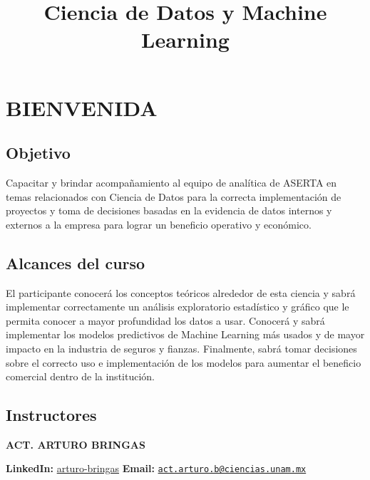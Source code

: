 \documentclass[
]{book}
\title{Ciencia de Datos y Machine Learning}
\author{}
\date{\vspace{-2.5em}}
\begin{document}
\maketitle

{
\setcounter{tocdepth}{1}
\tableofcontents
}
\hypertarget{bienvenida}{%
\chapter*{BIENVENIDA}\label{bienvenida}}

\hypertarget{objetivo}{%
\section*{Objetivo}\label{objetivo}}

Capacitar y brindar acompañamiento al equipo de analítica de ASERTA en temas relacionados con Ciencia de Datos para la correcta implementación de proyectos y toma de decisiones basadas en la evidencia de datos internos y externos a la empresa para lograr un beneficio operativo y económico.

\hypertarget{alcances-del-curso}{%
\section*{Alcances del curso}\label{alcances-del-curso}}

El participante conocerá los conceptos teóricos alrededor de esta ciencia y sabrá implementar correctamente un análisis exploratorio estadístico y gráfico que le permita conocer a mayor profundidad los datos a usar. Conocerá y sabrá implementar los modelos predictivos de Machine Learning más usados y de mayor impacto en la industria de seguros y fianzas. Finalmente, sabrá tomar decisiones sobre el correcto uso e implementación de los modelos para aumentar el beneficio comercial dentro de la institución.

\hypertarget{instructores}{%
\section*{Instructores}\label{instructores}}

\textbf{ACT. ARTURO BRINGAS}

\textbf{LinkedIn:} \href{https://www.linkedin.com/in/arturo-bringas/}{arturo-bringas}
\textbf{Email:} \href{mailto:act.arturo.b@ciencias.unam.mx}{\nolinkurl{act.arturo.b@ciencias.unam.mx}}
\end{document}
